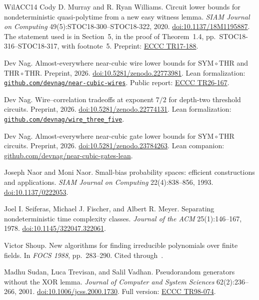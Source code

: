 \documentclass[11pt,letterpaper]{article}
\theoremstyle{definition}
\theoremstyle{remark}
\newcommand{\THR}{\mathrm{THR}}
\newcommand{\SYM}{\mathrm{SYM}}
\begin{document}
\begin{thebibliography}{WilACC14}
Cody D. Murray and R. Ryan Williams. Circuit lower bounds for
nondeterministic quasi-polytime from a new easy witness lemma.
\emph{SIAM Journal on Computing} 49(5):STOC18-300--STOC18-322, 2020.
\href{https://doi.org/10.1137/18M1195887}{doi:10.1137/18M1195887}.
The statement used is in Section~5, in the proof of Theorem~1.4,
pp.~STOC18-316--STOC18-317, with footnote~5. Preprint:
\href{https://eccc.weizmann.ac.il/report/2017/188/}{ECCC TR17-188}.

Dev Nag. Almost-everywhere near-cubic wire lower bounds for
\(\SYM\circ\THR\) and \(\THR\circ\THR\).
Preprint, 2026.
\href{https://doi.org/10.5281/zenodo.22773981}{doi:10.5281/zenodo.22773981}.
Lean formalization: \href{https://github.com/devnag/near-cubic-wires}{\nolinkurl{github.com/devnag/near-cubic-wires}}.
Public report: \href{https://eccc.weizmann.ac.il/report/2026/167/}{ECCC TR26-167}.

Dev Nag. Wire--correlation tradeoffs at exponent \(7/2\)
for depth-two threshold circuits.
Preprint, 2026.
\href{https://doi.org/10.5281/zenodo.22774131}{doi:10.5281/zenodo.22774131}.
Lean formalization: \href{https://github.com/devnag/wire_three_five}{\nolinkurl{github.com/devnag/wire_three_five}}.

Dev Nag. Almost-everywhere near-cubic gate lower bounds for
\(\SYM\circ\THR\) circuits.
Preprint, 2026.
\href{https://doi.org/10.5281/zenodo.23784263}{doi:10.5281/zenodo.23784263}.
Lean companion:
\href{https://github.com/devnag/near-cubic-gates-lean}{github.com/devnag/near-cubic-gates-lean}.

Joseph Naor and Moni Naor. Small-bias probability spaces: efficient
constructions and applications. \emph{SIAM Journal on Computing}
22(4):838--856, 1993.
\href{https://doi.org/10.1137/0222053}{doi:10.1137/0222053}.


Joel I. Seiferas, Michael J. Fischer, and Albert R. Meyer.
Separating nondeterministic time complexity classes.
\emph{Journal of the ACM} 25(1):146--167, 1978.
\href{https://doi.org/10.1145/322047.322061}{doi:10.1145/322047.322061}.


Victor Shoup. New algorithms for finding irreducible polynomials over
finite fields. In \emph{FOCS 1988}, pp.~283--290. Cited
through~\cite[Algorithm~17]{BCGT13}.


Madhu Sudan, Luca Trevisan, and Salil Vadhan.
Pseudorandom generators without the XOR lemma.
\emph{Journal of Computer and System Sciences} 62(2):236--266, 2001.
\href{https://doi.org/10.1006/jcss.2000.1730}{doi:10.1006/jcss.2000.1730}. Full version: \href{https://eccc.weizmann.ac.il/report/1998/074/}{ECCC TR98-074}.


\end{thebibliography}
\end{document}
